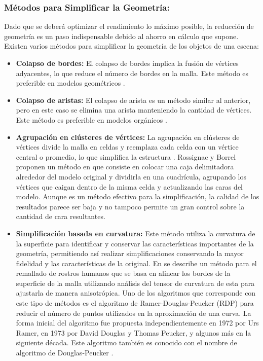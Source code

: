             \subsubsection{Métodos para Simplificar la Geometría: }
            Dado que se deberá optimizar el rendimiento lo máximo posible, la reducción de geometría es un paso indispensable debido al ahorro en cálculo que supone. Existen varios métodos para simplificar la geometría de los objetos de una escena:
                \begin{itemize}
                    \item \textbf{Colapso de bordes: }El colapso de bordes implica la fusión de vértices adyacentes, lo que reduce el número de bordes en la malla. Este método es preferible en modelos geométricos \cite{linkedinmeshsimplification}. 
                    \item \textbf{Colapso de aristas: } El colapso de arista es un método similar al anterior, pero en este caso se elimina una arista  manteniendo la cantidad de vértices. Este método es preferible en modelos orgánicos  \cite{linkedinmeshsimplification}.
                    \item \textbf{Agrupación en clústeres de vértices: }La agrupación en clústeres de vértices divide la malla en celdas y reemplaza cada celda con un vértice central o promedio, lo que simplifica la estructura \cite{linkedinmeshsimplification}. Rossignac y Borrel proponen un método en \cite{Rossignac1993} que consiste en colocar una caja delimitadora alrededor del modelo original y dividirla en una cuadrícula, agrupando los vértices que caigan dentro de la misma celda y actualizando las caras del modelo. Aunque es un método efectivo para la simplificación, la calidad de los resultados parece ser baja y no tampoco permite un gran control sobre la cantidad de cara resultantes.
                    \item \textbf{Simplificación basada en curvatura: }Este método utiliza la curvatura de la superficie para identificar y conservar las características importantes de la geometría, permitiendo así realizar simplificaciones conservando la mayor fidelidad y las características de la original. En \cite{Jinete2015} se describe un método para el remallado de rostros humanos que se basa en alinear los bordes de la superficie de la malla utilizando análisis del tensor de curvatura de esta para ajustarla de manera anisotrópica. Uno de los algoritmos que corresponde con este tipo de métodos es el algoritmo de Ramer-Douglas-Peucker (RDP) para reducir el número de puntos utilizados en la aproximación de una curva. La forma inicial del algoritmo fue propuesta independientemente en 1972 por Urs Ramer, en 1973 por David Douglas y Thomas Peucker, y algunos más en la siguiente década. Este algoritmo también es conocido con el nombre de algoritmo de Douglas-Peucker \cite{RamerDouglasPeucker}.                

\end{itemize}
